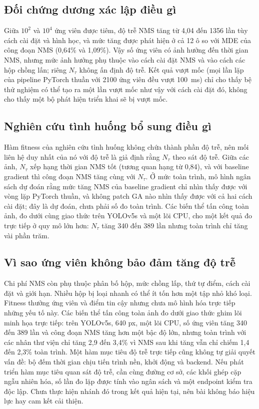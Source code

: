 \documentclass[12pt,a4paper]{article}
\newcommand{\Ntau}{N_{\tau}}
\begin{document}
\subsection{Đối chứng dương xác lập điều gì}
Giữa $10^2$ và $10^4$ ứng viên được tiêm, độ trễ NMS tăng từ 4,04 đến 1356 lần tùy cách cài đặt và hình học, và mức tăng được phát hiện ở cả 12 ô so với MDE của công đoạn NMS (0,64\% và 1,09\%). Vậy số ứng viên có ảnh hưởng đến thời gian NMS, nhưng mức ảnh hưởng phụ thuộc vào cách cài đặt NMS và vào cách các hộp chồng lấn; riêng $\Ntau$ không ấn định độ trễ. Kết quả vượt mốc (mọi lần lặp của pipeline PyTorch thuần với 2100 ứng viên đều vượt 100~ms) chỉ cho thấy bệ thử nghiệm có thể tạo ra một lần vượt mốc như vậy với cách cài đặt đó, không cho thấy một bộ phát hiện triển khai sẽ bị vượt mốc.

\subsection{Nghiên cứu tình huống bổ sung điều gì}
Hàm fitness của nghiên cứu tình huống không chứa thành phần độ trễ, nên mối liên hệ duy nhất của nó với độ trễ là giả định rằng $\Ntau$ theo sát độ trễ. Giữa các ảnh, $\Ntau$ xếp hạng thời gian NMS tốt (tương quan hạng từ 0,84), và với baseline gradient thì công đoạn NMS tăng cùng với $\Ntau$. Ở mức toàn trình, mô hình ngân sách dự đoán rằng mức tăng NMS của baseline gradient chỉ nhìn thấy được với vòng lặp PyTorch thuần, và không patch GA nào nhìn thấy được với cả hai cách cài đặt; đây là dự đoán, chưa phải số đo toàn trình. Các biến thể tấn công toàn ảnh, đo dưới cùng giao thức trên YOLOv5s và một lõi CPU, cho một kết quả đo trực tiếp ở quy mô lớn hơn: $\Ntau$ tăng 340 đến 389 lần nhưng toàn trình chỉ tăng vài phần trăm.

\subsection{Vì sao ứng viên không bảo đảm tăng độ trễ}
Chi phí NMS còn phụ thuộc phân bố hộp, mức chồng lấp, thứ tự điểm, cách cài đặt và giới hạn. Nhiều hộp bị loại nhanh có thể ít tốn hơn một tập nhỏ khó loại. Fitness thưởng ứng viên và điểm tin cậy nhưng chưa mô hình hóa trực tiếp những yếu tố này. Các biến thể tấn công toàn ảnh đo dưới giao thức ghim lõi minh họa trực tiếp: trên YOLOv5s, 640 px, một lõi CPU, số ứng viên tăng 340 đến 389 lần và công đoạn NMS tăng hơn một bậc độ lớn, nhưng toàn trình với các nhân thư viện chỉ tăng 2,9 đến 3,4\% vì NMS sau khi tăng vẫn chỉ chiếm 1,4 đến 2,3\% toàn trình. Một hàm mục tiêu độ trễ trực tiếp cũng không tự giải quyết vấn đề: bộ đếm thời gian chịu tiến trình nền, khởi động và backend. Nếu phát triển hàm mục tiêu quan sát độ trễ, cần cùng đường cơ sở, các khối ghép cặp ngẫu nhiên hóa, số lần đo lặp được tính vào ngân sách và một endpoint kiểm tra độc lập. Chưa thực hiện nhánh đó trong kết quả hiện tại, nên bài không báo hiệu lực hay cam kết cải thiện.
\end{document}
